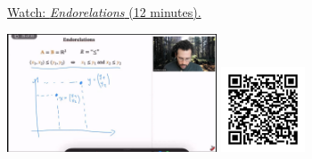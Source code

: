
\begin{minipage}{10cm}
    \href{https://act4e-spring21.netlify.app/videos/spring2021-relations:relations:endorel.html}{Watch: \emph{Endorelations} (12 minutes).}
        
    \href{https://act4e-spring21.netlify.app/videos/spring2021-relations:relations:endorel.html}{\includegraphics[height=3.5cm]{spring2021-relations:relations:endorel/thumbnails.jpg}}
    \href{https://act4e-spring21.netlify.app/videos/spring2021-relations:relations:endorel.html}{\includegraphics[height=2.5cm]{spring2021-relations:relations:endorel/qrcode.png}}
\end{minipage}
